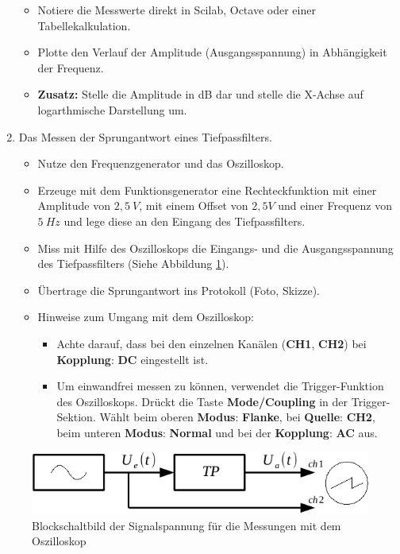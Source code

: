 \begin{enumerate}
\begin{itemize}
			\item Notiere die Messwerte direkt in Scilab, Octave oder einer Tabellekalkulation.
			\item Plotte den Verlauf der Amplitude (Ausgangsspannung) in Abhängigkeit der Frequenz.
			\item \textbf{Zusatz:} Stelle die Amplitude in dB dar und stelle die X-Achse auf logarthmische Darstellung um.
			\end{itemize}
	\item Das Messen der Sprungantwort eines Tiefpassfilters.
		\begin{itemize}
			\item Nutze den Frequenzgenerator und das Oszilloskop.
			\item Erzeuge mit dem Funktionsgenerator eine Rechteckfunktion mit einer Amplitude von $2,5~V$, mit einem Offset von $2,5 V$ und einer Frequenz von $5~Hz$ und lege diese an den Eingang des Tiefpassfilters.
			\item Miss mit Hilfe des Oszilloskops die Eingangs- und die Ausgangsspannung des Tiefpassfilters (Siehe Abbildung \ref{block2}).
			\item Übertrage die Sprungantwort ins Protokoll (Foto, Skizze).
			\item Hinweise zum Umgang mit dem Oszilloskop:
				\begin{itemize}
					\item Achte darauf, dass bei den einzelnen Kanälen (\textbf{CH1}, \textbf{CH2}) bei \textbf{Kopplung}: \textbf{DC} eingestellt ist.
					\item Um einwandfrei messen zu können, verwendet die Trigger-Funktion
            des Oszilloskops. Drückt die Taste \textbf{Mode/Coupling} in der
            Trigger-Sektion. Wählt beim oberen \textbf{Modus}: \textbf{Flanke}, bei \textbf{Quelle}: \textbf{CH2}, beim unteren \textbf{Modus}: \textbf{Normal} und bei der \textbf{Kopplung}: \textbf{AC} aus.
					\end{itemize}
			\end{itemize}
 	\end{enumerate} 


\bigskip

\begin{figure}[H]
	\centering
	\includegraphics[scale=1]{Messtechnik/Bilder/Block_Messung_oszi.pdf}
	\caption{Blockschaltbild der Signalspannung für die Messungen mit dem Oszilloskop}
	\label{block2}
	\end{figure}
